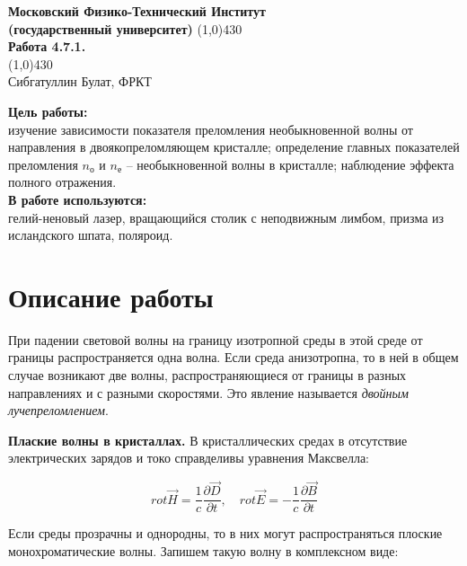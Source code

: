 \documentclass[a4paper, 12pt]{article}%
\begin{document}
\begin{titlepage}

\begin{center}
\large\textbf{Московский Физико-Технический Институт}\\
\large\textbf{(государственный университет)}
\vfill
\line(1,0){430}\\[1mm]
\huge\textbf{Работа 4.7.1.}\\
\line(1,0){430}\\[1mm]
\vfill
\large Сибгатуллин Булат, ФРКТ\\
\end{center}

\end{titlepage}
\noindent \textbf{Цель работы:} \\
\indent изучение зависимости показателя преломления необыкновенной волны от направления в двоякопреломляющем кристалле; определение главных показателей преломления $n_\text{о}$ и $n_\text{е}$ -- необыкновенной волны в кристалле; наблюдение эффекта полного отражения.\\
\noindent \textbf{В работе используются:} \\
\indent гелий-неновый лазер, вращающийся столик с неподвижным лимбом, призма из исландского шпата, поляроид.

\section*{Описание работы}

При падении световой волны на границу изотропной среды в этой
среде от границы распространяется одна волна. Если среда анизотропна, то в ней в общем случае возникают две волны, распространяющиеся
от границы в разных направлениях и с разными скоростями. Это явление называется \textit{двойным лучепреломлением}.

\textbf{Плаские волны в кристаллах.} В кристаллических средах в отсутствие электрических зарядов и токо справделивы уравнения Максвелла:

\begin{equation}
rot \overrightarrow{H} = \frac{1}{c}\frac{\partial \overrightarrow{D}}{\partial t}, \quad rot \overrightarrow{E} = - \frac{1}{c} \frac{\partial \overrightarrow{B}}{\partial t}
\end{equation}

Если среды прозрачны и однородны, то в них могут распространяться плоские монохроматические волны. Запишем такую волну в комплексном виде:
\end{document}
